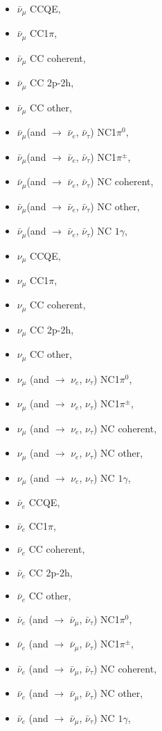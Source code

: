 \begin{itemize}

\item  $\bar{\nu}_{\mu}$ CCQE,
\item  $\bar{\nu}_{\mu}$ CC1$\pi$,
\item  $\bar{\nu}_{\mu}$ CC coherent,
\item  $\bar{\nu}_{\mu}$ CC 2p-2h,
\item  $\bar{\nu}_{\mu}$ CC other,

\item  $\bar{\nu}_{\mu}$(and $\rightarrow$ $\bar{\nu}_{e}$, $\bar{\nu}_{\tau}$) NC1$\pi^{0}$,
\item  $\bar{\nu}_{\mu}$(and $\rightarrow$ $\bar{\nu}_{e}$, $\bar{\nu}_{\tau}$) NC1$\pi^{\pm}$,
\item  $\bar{\nu}_{\mu}$(and $\rightarrow$ $\bar{\nu}_{e}$, $\bar{\nu}_{\tau}$) NC coherent,
\item  $\bar{\nu}_{\mu}$(and $\rightarrow$ $\bar{\nu}_{e}$, $\bar{\nu}_{\tau}$) NC other,
\item  $\bar{\nu}_{\mu}$(and $\rightarrow$ $\bar{\nu}_{e}$, $\bar{\nu}_{\tau}$) NC $1\gamma$,

\item  $\nu_{\mu}$ CCQE,
\item  $\nu_{\mu}$ CC1$\pi$, 
\item  $\nu_{\mu}$ CC coherent, 
\item  $\nu_{\mu}$ CC 2p-2h,
\item  $\nu_{\mu}$ CC other, 
\item  $\nu_{\mu}$ (and $\rightarrow$ $\nu_{e}$, $\nu_{\tau}$) NC1$\pi^{0}$,
\item  $\nu_{\mu}$ (and $\rightarrow$ $\nu_{e}$, $\nu_{\tau}$) NC1$\pi^{\pm}$, 
\item  $\nu_{\mu}$ (and $\rightarrow$ $\nu_{e}$, $\nu_{\tau}$) NC coherent,
\item  $\nu_{\mu}$ (and $\rightarrow$ $\nu_{e}$, $\nu_{\tau}$) NC other, 
\item  $\nu_{\mu}$ (and $\rightarrow$ $\nu_{e}$, $\nu_{\tau}$) NC $1\gamma$, 

\item  $\bar{\nu}_{e}$ CCQE,
\item  $\bar{\nu}_{e}$ CC1$\pi$,
\item  $\bar{\nu}_{e}$ CC coherent,
\item  $\bar{\nu}_{e}$ CC 2p-2h,
\item  $\bar{\nu}_{e}$ CC other,

\item  $\bar{\nu}_{e}$ (and $\rightarrow$ $\bar{\nu}_{\mu}$, $\bar{\nu}_{\tau}$) NC1$\pi^{0}$,
\item  $\bar{\nu}_{e}$ (and $\rightarrow$ $\bar{\nu}_{\mu}$, $\bar{\nu}_{\tau}$) NC1$\pi^{\pm}$,
\item  $\bar{\nu}_{e}$ (and $\rightarrow$ $\bar{\nu}_{\mu}$, $\bar{\nu}_{\tau}$) NC coherent,
\item  $\bar{\nu}_{e}$ (and $\rightarrow$ $\bar{\nu}_{\mu}$, $\bar{\nu}_{\tau}$) NC other,
\item  $\bar{\nu}_{e}$ (and $\rightarrow$ $\bar{\nu}_{\mu}$, $\bar{\nu}_{\tau}$) NC $1\gamma$,


\end{itemize}
